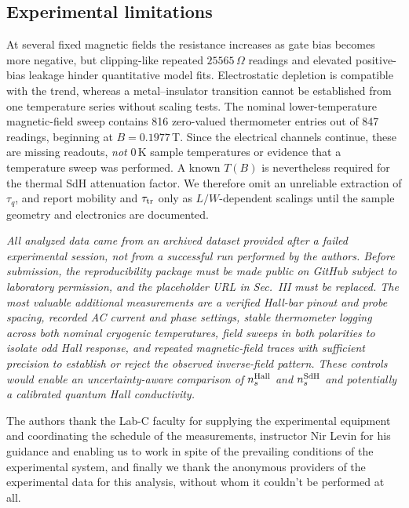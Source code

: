 \documentclass[
    aps,
    prb, 
    twocolumn, superscriptaddress,
    amsmath,
    amssymb,
    floatfix
]{revtex4-2}
\begin{document}
\subsection{Experimental limitations}
At several fixed magnetic fields the resistance increases as gate bias becomes more negative, but clipping-like repeated $25565\,\Omega$ readings and elevated positive-bias leakage hinder quantitative model fits. Electrostatic depletion is compatible with the trend, whereas a metal--insulator transition cannot be established from one temperature series without scaling tests\cite{lee1985,ando1982}. The nominal lower-temperature magnetic-field sweep contains 816 zero-valued thermometer entries out of 847 readings, beginning at $B=0.1977\,$T. Since the electrical channels continue, these are missing readouts, \emph{not} $0\,$K sample temperatures or evidence that a temperature sweep was performed. A known $T(B)$ is nevertheless required for the thermal SdH attenuation factor. We therefore omit an unreliable extraction of $\tau_q$, and report mobility and $\tau_{\rm tr}$ only as $L/W$-dependent scalings until the sample geometry and electronics are documented.

\emph{All analyzed data came from an archived dataset provided after a failed experimental session, not from a successful run performed by the authors. Before submission, the reproducibility package must be made public on GitHub subject to laboratory permission, and the placeholder URL in Sec.~III must be replaced. The most valuable additional measurements are a verified Hall-bar pinout and probe spacing, recorded AC current and phase settings, stable thermometer logging across both nominal cryogenic temperatures, field sweeps in both polarities to isolate odd Hall response, and repeated magnetic-field traces with sufficient precision to establish or reject the observed inverse-field pattern. These controls would enable an uncertainty-aware comparison of $n_s^{\rm Hall}$ and $n_s^{\rm SdH}$ and potentially a calibrated quantum Hall conductivity.
}

\begin{acknowledgments}

The authors thank the Lab-C faculty for supplying the experimental equipment and coordinating the schedule of the measurements, instructor Nir Levin for his guidance and enabling us to work in spite of the prevailing conditions of the experimental system, and finally we thank the anonymous providers of the experimental data for this analysis, without whom it couldn't be performed at all.

\end{acknowledgments}
\end{document}
